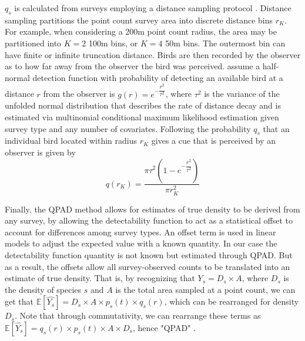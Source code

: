 \par $q_s$ is calculated from surveys employing a distance sampling protocol \citep{buckland_introduction_2001, buckland_distance_2015}. Distance sampling partitions the point count survey area into discrete distance bins $r_K$. For example, when considering a 200m point count radius, the area may be partitioned into $K = 2$ 100m bins, or $K = 4$ 50m bins. The outermost bin can have finite or infinite truncation distance. Birds are then recorded by the observer as to how far away from the observer the bird was perceived. \citet{solymos_calibrating_2013} assume a half-normal detection function with probability of detecting an available bird at a distance $r$ from the observer is $g(r) = e^{-\dfrac{r^2}{\tau^2}}$, where $\tau^2$ is the variance of the unfolded normal distribution that describes the rate of distance decay and is estimated via multinomial conditional maximum likelihood estimation given survey type and any number of covariates. Following \citet{buckland_introduction_2001, solymos_calibrating_2013} the probability $q_s$ that an individual bird located within radius $r_K$ gives a cue that is perceived by an observer is given by
\begin{equation*}
	q(r_K) = \dfrac{\pi \tau^2 \left(1 - e^{-\dfrac{r^2}{\tau^2}}\right)}{\pi r^2_K}
\end{equation*}

\par Finally, the QPAD method allows for estimates of true density to be derived from any survey, by allowing the detectability function to act as a statistical offset to account for differences among survey types. An offset term is used in linear models to adjust the expected value with a known quantity. In our case the detectability function quantity is not known but estimated through QPAD. But as a result, the offsets allow all survey-observed counts to be translated into an estimate of true density. That is, by recognizing that $Y_s = D_s \times A$, where $D_s$ is the density of species $s$ and $A$ is the total area sampled at a point count, we can get that $\mathbb{E}\left[\hat{Y_s}\right] = D_s \times A \times p_s(t) \times q_s(r)$, which can be rearranged for density $D_s$. Note that through commutativity, we can rearrange these terms as $\mathbb{E}\left[\hat{Y_s}\right] = q_s(r) \times p_s(t) \times A \times D_s$, hence "QPAD" \citep{solymos_calibrating_2013}.

